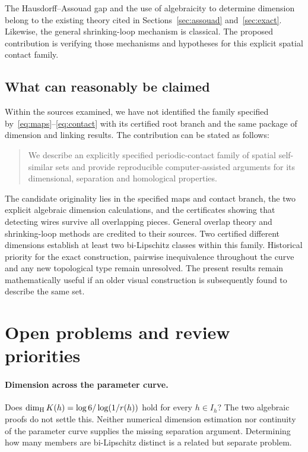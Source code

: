 The Hausdorff--Assouad gap and the use of algebraicity to determine dimension
belong to the existing theory cited in Sections~\ref{sec:assouad}
and~\ref{sec:exact}. Likewise, the general shrinking-loop mechanism is
classical. The proposed contribution is verifying those mechanisms and
hypotheses for this explicit spatial contact family.

\subsection{What can reasonably be claimed}
Within the sources examined, we have not identified the family specified
by~\eqref{eq:maps}--\eqref{eq:contact} with its certified root branch and the
same package of dimension and linking results. The contribution can be
stated as follows:
\begin{quote}
We describe an explicitly specified periodic-contact family of spatial
self-similar sets and provide reproducible computer-assisted arguments for
its dimensional, separation and homological properties.
\end{quote}
The candidate originality lies in the specified maps and contact branch,
the two explicit algebraic dimension calculations, and the certificates
showing that detecting wires survive all overlapping pieces. General
overlap theory and shrinking-loop methods are credited to their sources.
Two certified different dimensions establish at least two bi-Lipschitz
classes within this family. Historical priority for the exact construction,
pairwise inequivalence throughout the curve and any new topological type
remain unresolved. The present results remain mathematically useful if an
older visual construction is subsequently found to describe the same set.

\section{Open problems and review priorities}\label{sec:open}
\paragraph{Dimension across the parameter curve.}
Does $\dim_{\mathrm H} K(h)=\log6/\log(1/r(h))$ hold for every $h\in I_h$?
The two algebraic proofs do not settle this. Neither numerical dimension
estimation nor continuity of the parameter curve supplies the missing
separation argument. Determining how many members are bi-Lipschitz distinct
is a related but separate problem.

